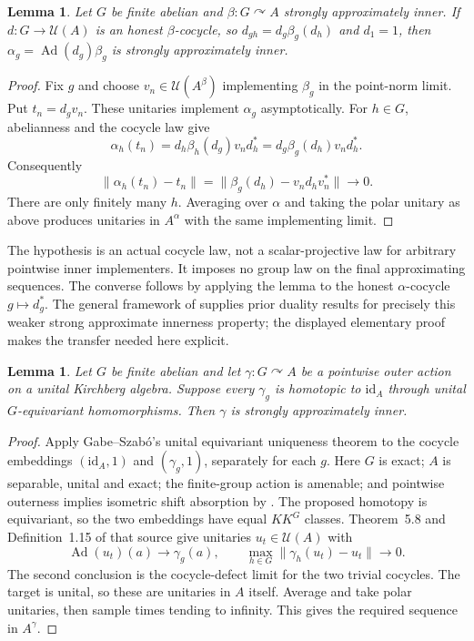 \documentclass[11pt,a4paper]{article}
\newtheorem{lemma}[theorem]{Lemma}
\theoremstyle{definition}
\newcommand{\Ad}{\operatorname{Ad}}
\newcommand{\U}{\mathcal U}
\begin{document}
\begin{lemma}\label{lem:cocycle}
Let $G$ be finite abelian and $\beta:G\curvearrowright A$ strongly
approximately inner. If $d:G\to\U(A)$ is an honest $\beta$-cocycle,
so $d_{gh}=d_g\beta_g(d_h)$ and $d_1=1$, then
$\alpha_g=\Ad(d_g)\beta_g$ is strongly approximately inner.
\end{lemma}
\begin{proof}
Fix $g$ and choose $v_n\in\U(A^\beta)$ implementing $\beta_g$ in the
point-norm limit. Put $t_n=d_gv_n$. These unitaries implement $\alpha_g$
asymptotically. For $h\in G$, abelianness and the cocycle law give
\[
 \alpha_h(t_n)=d_h\beta_h(d_g)v_nd_h^*
              =d_g\beta_g(d_h)v_nd_h^*.
\]
Consequently
\[
 \|\alpha_h(t_n)-t_n\|
   =\|\beta_g(d_h)-v_nd_hv_n^*\|\longrightarrow0.
\]
There are only finitely many $h$. Averaging over $\alpha$ and taking the
polar unitary as above produces unitaries in $A^\alpha$ with the same
implementing limit.
\end{proof}

The hypothesis is an actual cocycle law, not a scalar-projective law for
arbitrary pointwise inner implementers. It imposes no group law on the
final approximating sequences. The converse follows by applying the lemma
to the honest $\alpha$-cocycle $g\mapsto d_g^*$.
The general framework of \cite[Remark~3.2 and Theorem~3.7]{CNS} supplies
prior duality results for precisely this weaker strong approximate
innerness property; the displayed elementary proof makes the transfer
needed here explicit.

\begin{lemma}\label{lem:outer}
Let $G$ be finite abelian and let $\gamma:G\curvearrowright A$ be a
pointwise outer action on a unital Kirchberg algebra. Suppose every
$\gamma_g$ is homotopic to $\mathrm{id}_A$ through unital
$G$-equivariant homomorphisms. Then $\gamma$ is strongly approximately inner.
\end{lemma}
\begin{proof}
Apply Gabe--Szab\'o's unital equivariant uniqueness theorem
\cite[Theorem~5.8]{GS} to the cocycle embeddings
$(\mathrm{id}_A,1)$ and $(\gamma_g,1)$, separately for each $g$.
Here $G$ is exact; $A$ is separable, unital and exact; the finite-group
action is amenable; and pointwise outerness implies isometric shift
absorption by \cite[Proposition~3.14 in v1]{GS}.
The proposed homotopy is equivariant, so the two embeddings have equal
$KK^G$ classes. Theorem~5.8 and Definition~1.15 of that source give
unitaries $u_t\in\U(A)$ with
\[
 \Ad(u_t)(a)\longrightarrow\gamma_g(a),\qquad
 \max_{h\in G}\|\gamma_h(u_t)-u_t\|\longrightarrow0.
\]
The second conclusion is the cocycle-defect limit for the two trivial
cocycles. The target is unital, so these are unitaries in $A$ itself.
Average and take polar unitaries, then sample times tending to infinity.
This gives the required sequence in $A^\gamma$.
\end{proof}
\end{document}

